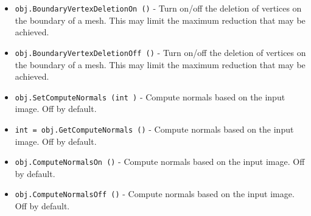 \begin{itemize}
\item  \verb|obj.BoundaryVertexDeletionOn ()| -  Turn on/off the deletion of vertices on the boundary of a mesh. This
 may limit the maximum reduction that may be achieved.

\item  \verb|obj.BoundaryVertexDeletionOff ()| -  Turn on/off the deletion of vertices on the boundary of a mesh. This
 may limit the maximum reduction that may be achieved.

\item  \verb|obj.SetComputeNormals (int )| -  Compute normals based on the input image. Off by default.

\item  \verb|int = obj.GetComputeNormals ()| -  Compute normals based on the input image. Off by default.

\item  \verb|obj.ComputeNormalsOn ()| -  Compute normals based on the input image. Off by default.

\item  \verb|obj.ComputeNormalsOff ()| -  Compute normals based on the input image. Off by default.

\end{itemize}
